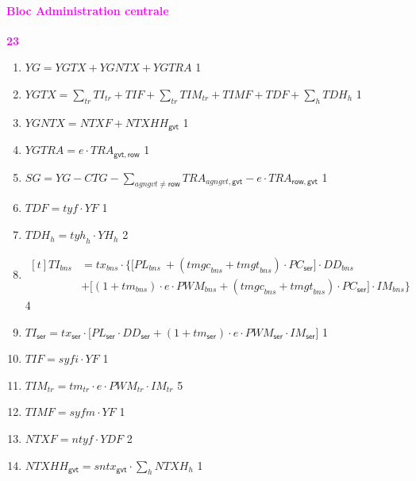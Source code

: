 \documentclass[11pt,a4paper]{article}
\newcommand{\agngvt}{\mathit{agngvt}}
\newcommand{\bns}{\mathit{bns}}
\newcommand{\gvt}{\mathsf{gvt}}
\newcommand{\ntyf}{\mathit{ntyf}}
\newcommand{\row}{\mathsf{row}}
\newcommand{\ser}{\mathsf{ser}}
\newcommand{\sntx}{\mathit{sntx}}
\newcommand{\syfi}{\mathit{syfi}}
\newcommand{\syfm}{\mathit{syfm}}
\newcommand{\tm}{\mathit{tm}}
\newcommand{\tmgc}{\mathit{tmgc}}
\newcommand{\tmgt}{\mathit{tmgt}}
\newcommand{\tr}{\mathit{tr}}
\newcommand{\tx}{\mathit{tx}}
\newcommand{\tyf}{\mathit{tyf}}
\newcommand{\tyh}{\mathit{tyh}}
\newcommand{\CTG}{\mathit{CTG}}
\newcommand{\DD}{\mathit{DD}}
\newcommand{\IM}{\mathit{IM}}
\newcommand{\NTXF}{\mathit{NTXF}}
\newcommand{\NTXH}{\mathit{NTXH}}
\newcommand{\NTXHH}{\mathit{NTXHH}}
\newcommand{\PC}{\mathit{PC}}
\newcommand{\PL}{\mathit{PL}}
\newcommand{\PWM}{\mathit{PWM}}
\newcommand{\SG}{\mathit{SG}}
\newcommand{\TDF}{\mathit{TDF}}
\newcommand{\TDH}{\mathit{TDH}}
\newcommand{\TI}{\mathit{TI}}
\newcommand{\TIF}{\mathit{TIF}}
\newcommand{\TIM}{\mathit{TIM}}
\newcommand{\TIMF}{\mathit{TIMF}}
\newcommand{\TRA}{\mathit{TRA}}
\newcommand{\YDF}{\mathit{YDF}}
\newcommand{\YF}{\mathit{YF}}
\newcommand{\YG}{\mathit{YG}}
\newcommand{\YGNTX}{\mathit{YGNTX}}
\newcommand{\YGTR}{\mathit{YGTRA}}
\newcommand{\YGTX}{\mathit{YGTX}}
\newcommand{\YH}{\mathit{YH}}
\newcommand{\redparagraph}[1]{\paragraph*{\large\textcolor{Fuchsia}{#1}}}
\begin{document}
	
	\redparagraph{Bloc Administration centrale}\hfill \textcolor{Fuchsia}{\textbf{23}}
	\begin{enumerate}[itemsep=2pt,label=\textbf{eq\arabic*}.,resume]
			
		\item $\YG = \YGTX + \YGNTX + \YGTR$   \hfill 1 
		
		\item $\YGTX = \sum_{\tr}\TI_{\tr} + \TIF + \sum_{\tr}\TIM_{\tr} + \TIMF + \TDF + \sum_{h} \TDH_h $ \hfill 1
		
		\item $\YGNTX = \NTXF + \NTXHH_{\gvt}$   \hfill 1 
		
		\item $\YGTR = e\cdot\TRA_{\gvt, \row} $ \hfill 1
		
		\item $\SG = \YG - \CTG  - \sum_{\agngvt\neq\row} \TRA_{\agngvt,\gvt} - e\cdot\TRA_{\row,\gvt}$ \hfill 1
		
		\item $\TDF = \tyf\cdot\YF$ \hfill 1
		
		\item $\TDH_h  = \tyh_h\cdot\YH_h$ \hfill 2
		
		\item $\begin{aligned}[t]
			\TI_{\bns} &= \tx_{\bns}\cdot \Bigg\{\Big[\PL_{\bns}\ +\left(\tmgc_{\bns} + \tmgt_{\bns}\right)\cdot\PC_{\ser}\Big]\cdot\DD_{\bns}\\
			& + \Big[(1 + \tm_{\bns})\cdot e \cdot \PWM_{\bns} +\left(\tmgc_{\bns} + \tmgt_{\bns}\right)\cdot\PC_{\ser} \Big]\cdot\IM_{\bns} \Bigg\} 
		\end{aligned}$ \hfill 4
		
		\item $\TI_{\ser} = \tx_{\ser}\cdot \Big[\PL_{\ser}\cdot\DD_{\ser} + (1 + \tm_{\ser})\cdot e \cdot \PWM_{\ser}\cdot\IM_{\ser} \Big]$ \hfill 1
		
		\item $\TIF = \syfi\cdot\YF$ \label{it:TIF}  \hfill 1
		
		\item $\TIM_{\tr} = \tm_{\tr} \cdot e \cdot \PWM_{\tr}\cdot\IM_{\tr}$ \hfill 5
		
		\item $\TIMF = \syfm\cdot\YF$  \label{it:TIM}\hfill 1	
			
		\item $\NTXF = \ntyf \cdot\YDF$ \label{it:TRAGVTf} \hfill 2
		
		\item  $\NTXHH_{\gvt} = \sntx_{\gvt} \cdot \sum_{h}\NTXH_h$  \hfill 1
		
	\end{enumerate}
	
\end{document}
